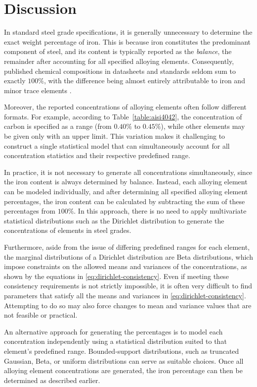 \documentclass[12pt,a4paper]{article}
\begin{document}
	
	\section{Discussion} \label{h:Discussion}
	In standard steel grade specifications, it is generally unnecessary to determine the exact weight percentage of iron. This is because iron constitutes the predominant component of steel, and its content is typically reported as the \emph{balance}, the remainder after accounting for all specified alloying elements. Consequently, published chemical compositions in datasheets and standards seldom sum to exactly \(100\%\), with the difference being almost entirely attributable to iron and minor trace elements \cite{huyett_engineering_handbook, nickel_institute_pulp_paper}.

	Moreover, the reported concentrations of alloying elements often follow different formats. For example, according to Table~\ref{table:aisi4042}, the concentration of carbon is specified as a range (from \(0.40\%\) to \(0.45\%\)), while other elements may be given only with an upper limit. This variation makes it challenging to construct a single statistical model that can simultaneously account for all concentration statistics and their respective predefined range.

	In practice, it is not necessary to generate all concentrations simultaneously, since the iron content is always determined by balance. Instead, each alloying element can be modeled individually, and after determining all specified alloying element percentages, the iron content can be calculated by subtracting the sum of these percentages from \(100\%\). In this approach, there is no need to apply multivariate statistical distributions such as the Dirichlet distribution to generate the concentrations of elements in steel grades. 

	Furthermore, aside from the issue of differing predefined ranges for each element, the marginal distributions of a Dirichlet distribution are Beta distributions, which impose constraints on the allowed means and variances of the concentrations, as shown by the equations in \ref{eq:dirichlet-consistency}. Even if meeting these consistency requirements is not strictly impossible, it is often very difficult to find parameters that satisfy all the means and variances in \ref{eq:dirichlet-consistency}. Attempting to do so may also force changes to mean and variance values that are not feasible or practical.

	An alternative approach for generating the percentages is to model each concentration independently using a statistical distribution suited to that element’s predefined range. Bounded-support distributions, such as truncated Gaussian, Beta, or uniform distributions can serve as suitable choices. Once all alloying element concentrations are generated, the iron percentage can then be determined as described earlier.
 
\end{document}
